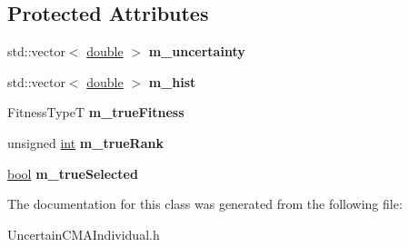 \subsection*{Protected Attributes}
\begin{DoxyCompactItemize}
\item 
std\+::vector$<$ \hyperlink{classdouble}{double} $>$ {\bfseries m\+\_\+uncertainty}\hypertarget{classUncertainIndividual_ac5f30637f666f2388930b70d7bd58f25}{}\label{classUncertainIndividual_ac5f30637f666f2388930b70d7bd58f25}

\item 
std\+::vector$<$ \hyperlink{classdouble}{double} $>$ {\bfseries m\+\_\+hist}\hypertarget{classUncertainIndividual_ab8679af59a7ec3926c5dc7f06335416d}{}\label{classUncertainIndividual_ab8679af59a7ec3926c5dc7f06335416d}

\item 
Fitness\+TypeT {\bfseries m\+\_\+true\+Fitness}\hypertarget{classUncertainIndividual_a1e4300ea3c248c8b04667f655690dfc1}{}\label{classUncertainIndividual_a1e4300ea3c248c8b04667f655690dfc1}

\item 
unsigned \hyperlink{classint}{int} {\bfseries m\+\_\+true\+Rank}\hypertarget{classUncertainIndividual_a30a285084e80349ee29b0de0437ee8f8}{}\label{classUncertainIndividual_a30a285084e80349ee29b0de0437ee8f8}

\item 
\hyperlink{classbool}{bool} {\bfseries m\+\_\+true\+Selected}\hypertarget{classUncertainIndividual_a8b61c869d0d7280fb726c5d9b2eaa600}{}\label{classUncertainIndividual_a8b61c869d0d7280fb726c5d9b2eaa600}

\end{DoxyCompactItemize}


The documentation for this class was generated from the following file\+:\begin{DoxyCompactItemize}
\item 
Uncertain\+C\+M\+A\+Individual.\+h\end{DoxyCompactItemize}
